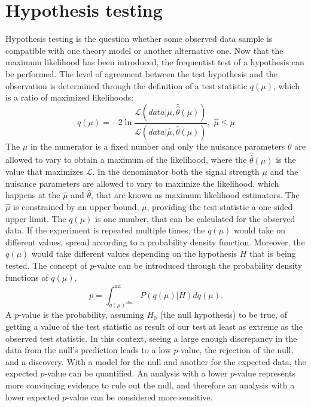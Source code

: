 \section{Hypothesis testing}
\noindent
\justify
Hypothesis testing is the question whether some observed data sample is compatible with one theory model or another alternative one.
Now that the maximum likelihood has been introduced, the frequentist test of a hypothesis can be performed. 
The level of agreement between the test hypothesis and the observation is determined through the definition of a test statistic $q(\mu)$, which is a ratio of maximized likelihoods:
\begin{equation}
q(\mu)=-2\ln\frac{\mathcal{L}(data|\mu, \hat{\hat{\theta}}(\mu))}{\mathcal{L}(data|\hat{\mu}, \hat{\theta}(\mu))},\, \, \hat{\mu}\leq\mu
\end{equation}
The $\mu$ in the numerator is a fixed number and only the nuisance parameters $\theta$ are allowed to vary to obtain a maximum of the likelihood, where the $\hat{\hat{\theta}}(\mu)$ is the value that maximizes $\mathcal{L}$.
In the denominator both the signal strength $\mu$ and the nuisance parameters are allowed to vary to maximize the likelihood, which happens at the $\hat{\mu}$ and $\hat{\theta}$, that are known as maximum likelihood estimators.
The $\hat{\mu}$ is constrained by an upper bound, $\mu$, providing the test statistic a one-sided upper limit. 
The $q(\mu)$ is one number, that can be calculated for the observed data. 
If the experiment is repeated multiple times, the $q(\mu)$ would take on different values, spread according to a probability density function.    
Moreover, the $q(\mu)$ would take different values depending on the hypothesis $H$ that is being tested. 
\newpara
\noindent\justify
The concept of $p$-value can be introduced through the probability density functions of $q(\mu)$, 
\begin{equation}
p=\int_{q(\mu)^{\mathrm{obs.}}}^{\inf}P(q(\mu)|H)dq(\mu).
\end{equation} 
A $p$-value is the probability, assuming $H_{0}$ (the null hypothesis) to be true, of getting a value of the test statistic as result of our test at least as extreme as the observed test statistic.
In this context, seeing a large enough discrepancy in the data from the null’s prediction leads to a low $p$-value, the rejection of the null, and a discovery. 
With a model for the null and another for the expected data, the expected $p$-value can be quantified. 
An analysis with a lower $p$-value represents more convincing evidence to rule out the null, and therefore an analysis with a lower expected $p$-value can be considered more sensitive. 
